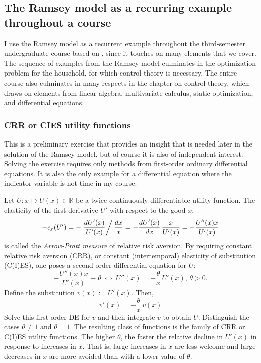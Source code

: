 \documentclass[graybox]{svmult}
\newcommand{\R}{\mathds{R}}
\begin{document}
\subsection{The Ramsey model as a recurring example throughout a course}

I use the Ramsey model as a recurrent example throughout the third-semester undergraduate course based on \cite{Sydsaeter2008}, since it touches on many elements that we cover. The sequence of examples from the Ramsey model culminates in the optimization problem for the household, for which control theory is necessary. The entire course also culminates in many respects in the chapter on control theory, which draws on elements from linear algebra, multivariate calculus, static optimization, and differential equations.

\subsubsection{CRR or CIES utility functions}

This is a preliminary exercise that provides an insight that is needed later in the solution of the Ramsey model, but of course it is also of independent interest. Solving the exercise requires only methods from first-order ordinary differential equations. It is also the only example for a differential equation where the indicator variable is not time in my course.

Let $U : x \mapsto U(x)\in\R$ be a twice continuously differentiable utility function.  The elasticity of the first derivative $U'$ with respect to the good $x$,
\[
    -\epsilon_x(U') = -\left.\frac{dU'(x)}{U'(x)}\right/\frac{dx}{x} = -\frac{dU'(x)}{dx}\, \frac{x}{U'(x)} = -\frac{U''(x) x}{U'(x)}
\]
    is called the \textit{Arrow-Pratt measure} of relative risk
    aversion.  By requiring constant relative risk aversion (CRR), or constant (intertemporal) elasticity of substitution (C(I)ES), one poses a second-order differential equation for $U$:
    \[
        -\frac{U''(x) x}{U'(x)} \equiv \theta \; \Longleftrightarrow\; U''(x) = -\frac{\theta}{x}\, U'(x),\, \theta>0.
    \]
    Define the substitution $v(x) := U'(x)$.  Then,
    \[
        v'(x) = -\frac{\theta}{x}\, v(x)
    \]
    Solve this first-order DE for $v$ and then integrate $v$ to obtain $U$.  Distinguish the cases $\theta\neq 1$ and $\theta =1$.  The resulting class of functions is the family of CRR or C(I)ES utility functions.  The higher $\theta$, the faster the relative decline in $U'(x)$ in response to increases in $x$.  That is, large increases in $x$ are less welcome and large decreases in $x$ are more avoided than with a lower value of $\theta$.
    
\end{document}

